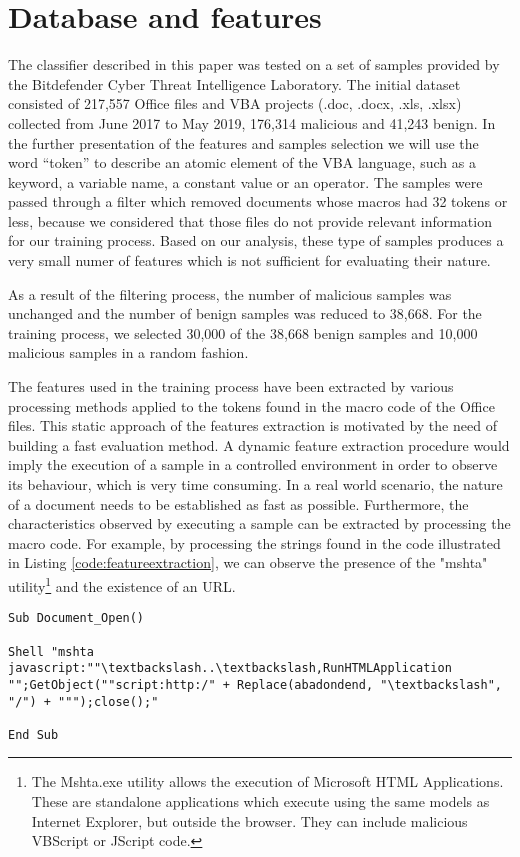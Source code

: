 \section{Database and features}
\par
The classifier described in this paper was tested on a set of samples provided by the Bitdefender Cyber Threat Intelligence Laboratory. The initial dataset consisted of 217,557 Office files and VBA projects (.doc, .docx, .xls, .xlsx) collected from June 2017 to May 2019, 176,314 malicious and 41,243 benign. In the further presentation of the features and samples selection we will use the word “token” to describe an atomic element of the VBA language, such as a keyword, a variable name, a constant value or an operator. The samples were passed through a filter which removed documents whose macros had 32 tokens or less,  because we considered that those files do not provide relevant information for our training process. Based on our analysis, these type of samples produces a very small numer of features which is not sufficient for evaluating their nature.  
\par
As a result of the filtering process, the number of malicious samples was unchanged and the number of benign samples was reduced to 38,668. For the training process, we selected 30,000 of the 38,668 benign samples and 10,000 malicious samples in a random fashion.
\par
The features used in the training process have been extracted by various processing methods applied to the tokens found in the macro code of the Office files. This static approach of the features extraction is motivated by the need of building a fast evaluation method. A dynamic feature extraction procedure would imply the execution of a sample in a controlled environment in order to observe its behaviour, which is very time consuming. In a real world scenario, the nature of a document needs to be established as fast as possible. Furthermore, the characteristics observed by executing a sample can be extracted by processing the macro code. For example, by processing the strings found in the code illustrated in Listing \ref{code:featureextraction}, we can observe the presence of the "mshta" utility\footnote{The Mshta.exe utility allows the execution of Microsoft HTML Applications. These are standalone applications which execute using the same models as Internet Explorer, but outside the browser. They can include malicious VBScript or JScript code.}   and the existence of an URL.

\begin{lstlisting}[style=A, caption={Example of malicious code inside a macro}, label={code:featureextraction}]
Sub Document_Open()

Shell "mshta javascript:""\textbackslash..\textbackslash,RunHTMLApplication "";GetObject(""script:http:/" + Replace(abadondend, "\textbackslash", "/") + """);close();"

End Sub
\end{lstlisting}

